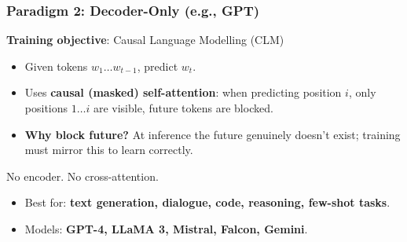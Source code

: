 \begin{frame}[fragile]\frametitle{Paradigm 2: Decoder-Only (e.g., GPT)}
    \textbf{Training objective}: Causal Language Modelling (CLM)
    \begin{itemize}
    \item Given tokens $w_1 \ldots w_{t-1}$, predict $w_t$.
    \item Uses \textbf{causal (masked) self-attention}: when predicting position $i$, only positions $1 \ldots i$ are visible,  future tokens are blocked.
    \item \textbf{Why block future?} At inference the future genuinely doesn't exist; training must mirror this to learn correctly.
    \end{itemize}
    \vspace{0.3em}
    No encoder. No cross-attention.
    \begin{itemize}
    \item Best for: \textbf{text generation, dialogue, code, reasoning, few-shot tasks}.
    \item Models: \textbf{GPT-4, LLaMA 3, Mistral, Falcon, Gemini}.
    \end{itemize}
\end{frame}

